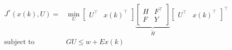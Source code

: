 \begin{align*}
    J^*(x(k), U)=          & \min_{U}\begin{bmatrix}
                                         U^\top & {x(k)}^\top
                                     \end{bmatrix}
    \underbrace{\begin{bmatrix}
                        H & F^\top \\
                        F & Y
                    \end{bmatrix}}_{\widetilde{H}}
    {\begin{bmatrix}
         U^\top & {x(k)}^\top
     \end{bmatrix}}^\top                                 \\
    \text{subject to}\quad & GU \leq w + Ex(k)
\end{align*}

